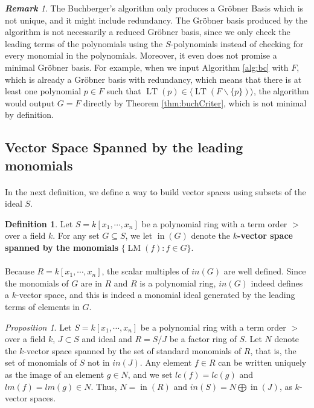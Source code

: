 \documentclass{article}
\newcommand{\lm}{\ensuremath{\operatorname{LM}}}
\newcommand{\lt}{\ensuremath{\operatorname{LT}}}
\newcommand{\initTerm}{\ensuremath{\operatorname{in}}}
\theoremstyle{definition}
\newtheorem{definition}{Definition}[section]
\theoremstyle{remark}
\newtheorem*{remark}{\textbf{Remark}}
\theoremstyle{example}
\newtheorem{prop}{Proposition}[section]
\begin{document}
\begin{remark}
    The Buchberger's algorithm only produces a Gröbner Basis which is not unique, and it might include redundancy. The Gröbner basis produced by the algorithm is not necessarily a reduced Gröbner basis, since we only check the leading terms of the polynomials using the $S$-polynomials instead of checking for every monomial in the polynomials. Moreover, it even does not promise a minimal Gröbner basis. For example, when we input Algorithm \ref{alg:bc} with $F$, which is already a Gröbner basis with redundancy, which means that there is at least one polynomial $p \in F$ such that $\lt(p) \in \langle \lt(F\backslash \{p\}) \rangle$, the algorithm would output $G = F$ directly by Theorem \ref{thm:buchCriter}, which is not minimal by definition.
\end{remark}

\subsection{Vector Space Spanned by the leading monomials}

\paragraph{}

In the next definition, we define a way to build vector spaces using subsets of the ideal $S$.

\begin{definition}
    Let $S = k[x_1,\cdots, x_n]$ be a polynomial ring with a term order $>$ over a field $k$. For any set $G \subseteq S$, we let $\initTerm(G)$ denote the \textbf{$k$-vector space spanned by the monomials} $\{\lm(f):f \in G\}$.
\end{definition}

\paragraph{}

Because $R = k[x_1,\cdots,x_n]$, the scalar multiples of $in(G)$ are well defined. Since the monomials of $G$ are in $R$ and $R$ is a polynomial ring, $in(G)$ indeed defines a $k$-vector space, and this is indeed a monomial ideal generated by the leading terms of elements in $G$.

\begin{prop}
    Let $S = k[x_1,\cdots, x_n]$ be a polynomial ring with a term order $>$ over a field $k$, $J \subset S$ and ideal and $R = S/J$ be a factor ring of $S$. Let $N$ denote the $k$-vector space spanned by the set of standard monomials of $R$, that is, the set of monomials of $S$ not in $in(J)$. Any element $f \in R$ can be written uniquely as the image of an element $g \in N$, and we set $lc(f) = lc(g)$ and $lm(f) = lm(g) \in N$. Thus, $N = \initTerm(R)$ and $in(S) = N \bigoplus \initTerm(J)$, as $k$-vector spaces.
\end{prop}
\end{document}
